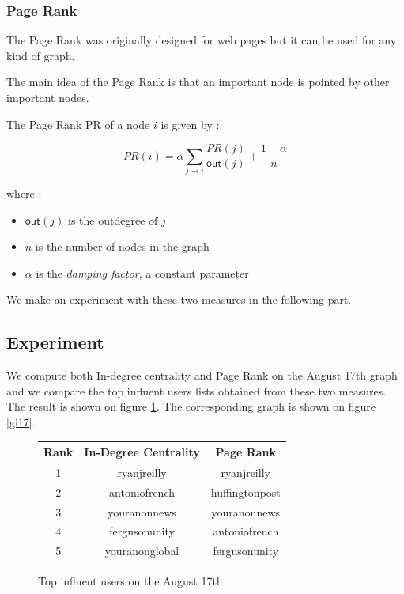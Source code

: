\documentclass[a4paper,twoside,12pt,openright]{report}
\begin{document}
\subsubsection{Page Rank}
\label{PRSec}
The Page Rank\cite{page1999pagerank} was originally designed for web pages but it can be used for any kind of graph.

The main idea of the Page Rank is that an important node is pointed by other important nodes.

The Page Rank PR of a node $i$ is given by :

$$ PR(i) = \alpha \sum_{j \rightarrow i} \frac{PR(j)}{\textsf{out}(j)} + \frac{1-\alpha}{n} $$

where :
\begin{itemize}
\item $\textsf{out}(j)$ is the outdegree of $j$
\item $n$ is the number of nodes in the graph
\item $\alpha$ is the \emph{damping factor}, a constant parameter
\end{itemize}

We make an experiment with these two measures in the following part.

\newpage

\subsection{Experiment}

We compute both In-degree centrality and Page Rank on the August 17th graph and we compare the top influent users lists obtained from these two measures. The result is shown on figure \ref{topinfluentTab11}. The corresponding graph is shown on figure \ref{gi17}.

\vspace{1cm}

\begin{figure}[H]
  \centering
\begin{tabular}{ccc}
\hline
Rank & \textbf{In-Degree Centrality} & \textbf{Page Rank}\\ \hline \hline
1 & ryanjreilly & ryanjreilly \\ \hline
2 & antoniofrench & \cellcolor{red!20} huffingtonpost \\ \hline
3 & youranonnews & youranonnews \\ \hline
4 & fergusonunity & antoniofrench \\ \hline
5 & youranonglobal & fergusonunity \\ \hline
\hline
\end{tabular}
\caption{Top influent users on the August 17th}
\label{topinfluentTab11}
\end{figure}
\end{document}
